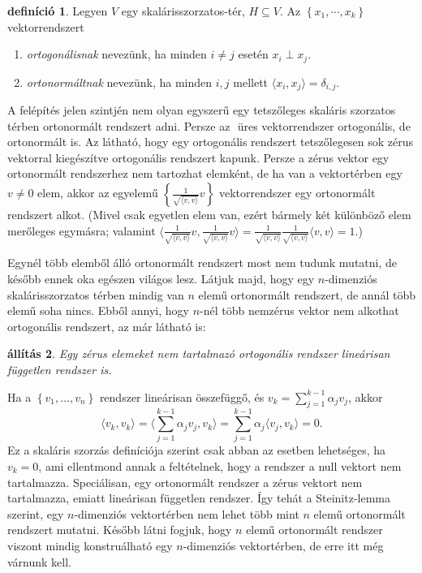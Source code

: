 \documentclass[9pt, a4paper, showtrims]{memoir}
\makeatletter
\renewenvironment{proof}[1][\proofname]
    {\par\pushQED{\qed}%
    \normalfont \topsep6\p@\@plus6\p@\relax
    \trivlist
    \item[\hskip\labelsep
        \itshape
    #1\@addpunct{:}]\ignorespaces}
    {\popQED\endtrivlist\@endpefalse}
\theoremstyle{plain}
\newtheorem{proposition}{állítás}[chapter]
\theoremstyle{remark}
\theoremstyle{definition}
\newtheorem{definition}[proposition]{definíció}
\newcommand{\ip}[2]{\langle#1,#2\rangle}
\makeatother
\begin{document}
\begin{definition}
	Legyen $V$ egy skalárisszorzatos-tér, $H\subseteq V$.
	Az $\left\{ x_1,\cdots,x_k \right\}$ vektorrendszert
	\begin{enumerate}
		\item \emph{ortogonálisnak} nevezünk, ha minden $i\neq j$ esetén
		      $x_i\perp x_j$.
		\item \emph{ortonormáltnak} nevezünk, ha minden $i,j$ mellett $\ip{x_i}{x_j}=\delta_{i,j}$.\qedhere
	\end{enumerate}
\end{definition}
A felépítés jelen szintjén nem olyan egyszerű egy tetszőleges skaláris szorzatos térben ortonormált rendszert
adni. Persze az ${}$ üres vektorrendszer ortogonális, de ortonormált is.
Az látható, hogy egy ortogonális rendszert tetszőlegesen sok zérus vektorral kiegészítve ortogonális rendszert kapunk.
Persze a zérus vektor egy ortonormált rendszerhez nem tartozhat elemként,
de ha van a vektortérben egy $v\neq 0$ elem,
akkor az egyelemű $\left\{ \frac{1}{\sqrt{\ip{v}{v}}}v \right\}$ vektorrendszer egy ortonormált rendszert alkot.
(Mivel csak egyetlen elem van, ezért bármely két különböző elem merőleges egymásra;
valamint
$\ip{\frac{1}{\sqrt{\ip{v}{v}}}v}{\frac{1}{\sqrt{\ip{v}{v}}}v}
	=
	\frac{1}{\sqrt{\ip{v}{v}}}
	\frac{1}{\sqrt{\ip{v}{v}}}
	\ip{v}{v}=1.
$)

Egynél több elemből álló ortonormált rendszert most nem tudunk mutatni,
de később ennek oka egészen világos lesz.
Látjuk majd, hogy egy $n$-dimenziós skalárisszorzatos térben mindig van $n$ elemű ortonormált rendszert, de annál több elemű soha nincs.
Ebből annyi, hogy $n$-nél több nemzérus vektor nem alkothat ortogonális rendszert, az már látható is:
\begin{proposition}
	Egy zérus elemeket nem tartalmazó ortogonális rendszer lineárisan független rendszer is.
\end{proposition}
\begin{proof}
	Ha a $\left\{ v_1,\ldots,v_n \right\}$ rendszer lineárisan összefüggő,
	és $v_k=\sum_{j=1}^{k-1}\alpha_jv_j$,
	akkor
	\[
		\ip{v_k}{v_k}
		=
		\ip{\sum_{j=1}^{k-1}\alpha_jv_j}{v_k}
		=
		\sum_{j=1}^{k-1}\alpha_j\ip{v_j}{v_k}
		=0.
	\]
	Ez a skaláris szorzás definíciója szerint csak abban az esetben lehetséges,
	ha $v_k=0$, ami ellentmond annak a feltételnek, hogy a rendszer a null vektort nem tartalmazza.
\end{proof}
Speciálisan, egy ortonormált rendszer a zérus vektort nem tartalmazza,
emiatt lineárisan független rendszer.
Így tehát a Steinitz-lemma szerint,
egy $n$-dimenziós vektortérben nem lehet több mint $n$ elemű ortonormált rendszert mutatni.
Később látni fogjuk,
hogy $n$ elemű ortonormált rendszer viszont mindig konstruálható egy $n$-dimenziós vektortérben,
de erre itt még várnunk kell.
\end{document}
